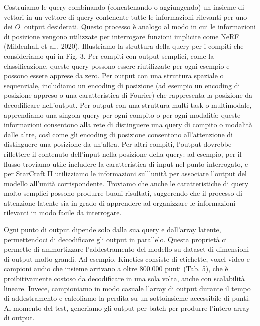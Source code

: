 \documentclass[
  11pt,
]{article}
\begin{document}
Costruiamo le query combinando (concatenando o aggiungendo) un insieme
di vettori in un vettore di query contenente tutte le informazioni
rilevanti per uno dei \(O\ \) output desiderati. Questo processo è
analogo al modo in cui le informazioni di posizione vengono utilizzate
per interrogare funzioni implicite come NeRF (Mildenhall et al., 2020).
Illustriamo la struttura della query per i compiti che consideriamo qui
in Fig. 3. Per compiti con output semplici, come la classificazione,
queste query possono essere riutilizzate per ogni esempio e possono
essere apprese da zero. Per output con una struttura spaziale o
sequenziale, includiamo un encoding di posizione (ad esempio un encoding
di posizione appreso o una caratteristica di Fourier) che rappresenta la
posizione da decodificare nell'output. Per output con
una struttura multi-task o multimodale, apprendiamo una singola query
per ogni compito o per ogni modalità: queste informazioni consentono
alla rete di distinguere una query di compito o modalità dalle altre,
così come gli encoding di posizione consentono
all'attenzione di distinguere una posizione da
un'altra. Per altri compiti, l'output
dovrebbe riflettere il contenuto dell'input nella
posizione della query: ad esempio, per il flusso troviamo utile
includere la caratteristica di input nel punto interrogato, e per
StarCraft II utilizziamo le informazioni sull'unità per
associare l'output del modello all'unità
corrispondente. Troviamo che anche le caratteristiche di query molto
semplici possono produrre buoni risultati, suggerendo che il processo di
attenzione latente sia in grado di apprendere ad organizzare le
informazioni rilevanti in modo facile da interrogare.

Ogni punto di output dipende solo dalla sua query e
dall'array latente, permettendoci di decodificare gli
output in parallelo. Questa proprietà ci permette di ammortizzare
l'addestramento del modello su dataset di dimensioni di
output molto grandi. Ad esempio, Kinetics consiste di etichette, voxel
video e campioni audio che insieme arrivano a oltre 800.000 punti (Tab.
5), che è proibitivamente costoso da decodificare in una sola volta,
anche con scalabilità lineare. Invece, campioniamo in modo casuale
l'array di output durante il tempo di addestramento e
calcoliamo la perdita su un sottoinsieme accessibile di punti. Al
momento del test, generiamo gli output per batch per produrre
l'intero array di output.
\end{document}

